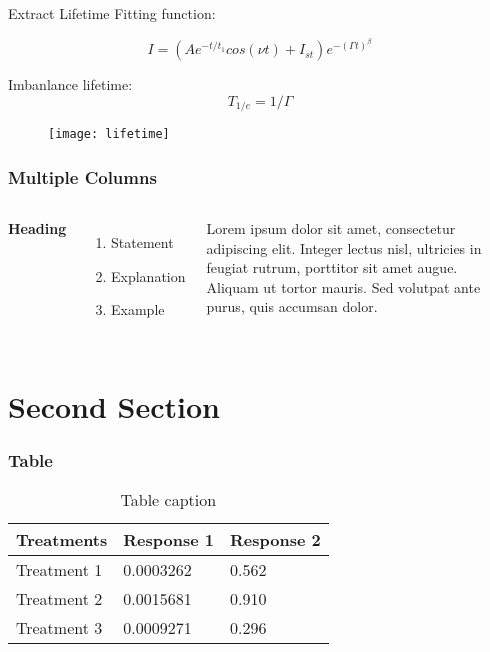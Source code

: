 \documentclass{beamer}
\begin{document}
\begin{frame}{Extract Lifetime}
Fitting function:

$$I=(Ae^{-t/t_1}cos(\nu t)+I_{st})e^{-(\Gamma t)^\beta}$$

Imbanlance lifetime:
$$T_{1/e} = 1/\Gamma$$
\begin{figure}
\texttt{[image: lifetime]}
\end{figure}
\end{frame}

\begin{frame}
\frametitle{Multiple Columns}
\begin{columns}[c] %

\textbf{Heading}
\begin{enumerate}
\item Statement
\item Explanation
\item Example
\end{enumerate}

Lorem ipsum dolor sit amet, consectetur adipiscing elit. Integer lectus nisl, ultricies in feugiat rutrum, porttitor sit amet augue. Aliquam ut tortor mauris. Sed volutpat ante purus, quis accumsan dolor.

\end{columns}
\end{frame}

\section{Second Section}

\begin{frame}
\frametitle{Table}
\begin{table}
\begin{tabular}{l l l}
\toprule
\textbf{Treatments} & \textbf{Response 1} & \textbf{Response 2}\\
\midrule
Treatment 1 & 0.0003262 & 0.562 \\
Treatment 2 & 0.0015681 & 0.910 \\
Treatment 3 & 0.0009271 & 0.296 \\
\bottomrule
\end{tabular}
\caption{Table caption}
\end{table}
\end{frame}
\end{document}
